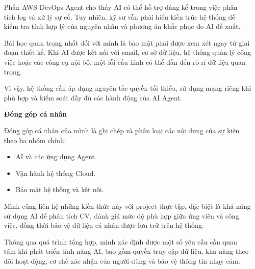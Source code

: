 Phần AWS DevOps Agent cho thấy AI có thể hỗ trợ đáng kể trong việc phân
tích log và xử lý sự cố. Tuy nhiên, kỹ sư vẫn phải hiểu kiến trúc hệ
thống để kiểm tra tính hợp lý của nguyên nhân và phương án khắc phục do
AI đề xuất.

Bài học quan trọng nhất đối với mình là bảo mật phải được xem xét ngay
từ giai đoạn thiết kế. Khi AI được kết nối với email, cơ sở dữ liệu, hệ
thống quản lý công việc hoặc các công cụ nội bộ, một lỗi cấu hình có thể
dẫn đến rò rỉ dữ liệu quan trọng.

Vì vậy, hệ thống cần áp dụng nguyên tắc quyền tối thiểu, sử dụng mạng
riêng khi phù hợp và kiểm soát đầy đủ các hành động của AI Agent.

\vspace{0.5em}\noindent\textbf{Đóng góp cá nhân}\par

Đóng góp cá nhân của mình là ghi chép và phân loại các nội dung của sự
kiện theo ba nhóm chính:

\begin{itemize}
\tightlist
\item
  AI và các ứng dụng Agent.
\item
  Vận hành hệ thống Cloud.
\item
  Bảo mật hệ thống và kết nối.
\end{itemize}

Mình cũng liên hệ những kiến thức này với project thực tập, đặc biệt là
khả năng sử dụng AI để phân tích CV, đánh giá mức độ phù hợp giữa ứng
viên và công việc, đồng thời bảo vệ dữ liệu cá nhân được lưu trữ trên hệ
thống.

Thông qua quá trình tổng hợp, mình xác định được một số yêu cầu cần quan
tâm khi phát triển tính năng AI, bao gồm quyền truy cập dữ liệu, khả
năng theo dõi hoạt động, cơ chế xác nhận của người dùng và bảo vệ thông
tin nhạy cảm.
